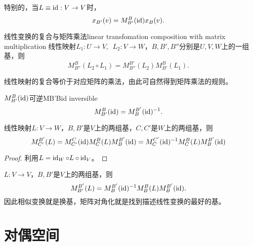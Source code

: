 特别的，当$L\equiv\operatorname{id}:V\to V$时， 
\[
	x_{B'}(v)=M_{B'}^B(\operatorname{id})x_B(v).
\]
\begin{theorem}{线性变换的复合与矩阵乘法}{linear transfomation composition with matrix multiplication}
	线性映射$L_1:U\to V,\enspace L_2:V\to W$，$B,B',B''$分别是$U,V,W$上的一组基，则
	\[
		M_{B''}^B(L_2\circ L_1)=M_{B''}^{B'}(L_2)M_{B'}^B(L_1).
	\]
\end{theorem}
\noindent 线性映射的复合等价于对应矩阵的乘法，由此可自然得到矩阵乘法的规则。
\begin{theorem}{$M_{B'}^B(\operatorname{id})$可逆}{MB'Bid inversible}
	\[
		M_{B'}^B(\operatorname{id})=M_B^{B'}(\operatorname{id})^{-1}.
	\]
\end{theorem}
\begin{theorem}{}{}
	线性映射$L:V\to W$，$B,B'$是$V$上的两组基，$C,C'$是$W$上的两组基，则
	\[
		M_{C'}^{B'}(L)=M_{C'}^C(\operatorname{id})M_C^B(L)M_B^{B'}(\operatorname{id})=M_C^{C'}(\operatorname{id})^{-1} M_C^B(L)M_B^{B'}(\operatorname{id})
	\]
\end{theorem}
\begin{proof}
	利用$L=\operatorname{id}_W\circ L\circ\operatorname{id}_V$。
\end{proof}
\begin{corollary}
	$L:V\to V$，$B,B'$是$V$上的两组基，则
	\[
		M_{B'}^{B'}(L)=M_B^{B'}(\operatorname{id})^{-1} M_B^B(L)M_B^{B'}(\operatorname{id}).
	\]
	因此相似变换就是换基，矩阵对角化就是找到描述线性变换的最好的基。
\end{corollary}

\section{对偶空间}

